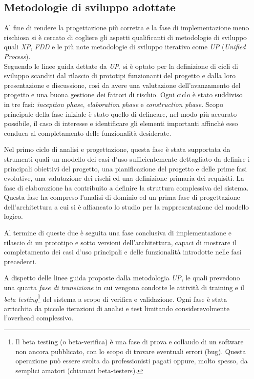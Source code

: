 \subsection{Metodologie di sviluppo adottate}
Al fine di rendere la progettazione più corretta e la fase di implementazione meno rischiosa si è cercato di cogliere gli aspetti qualificanti di metodologie di sviluppo quali \textit{XP}, \textit{FDD} e le più note metodologie di sviluppo iterativo come \textit{UP} (\emph{Unified Process}).\\
Seguendo le linee guida dettate da \textit{UP}, si è optato per la definizione di cicli di sviluppo scanditi dal rilascio di prototipi funzionanti del progetto e dalla loro presentazione e discussione, così da avere una valutazione dell'avanzamento del progetto e una buona gestione dei fattori di rischio. Ogni ciclo è stato suddiviso in tre fasi: \textit{inception phase}, \textit{elaboration phase} e \textit{construction phase}.
Scopo principale della fase iniziale è stato quello di delineare, nel modo più accurato possibile, il caso di interesse e identificare gli elementi importanti affinché esso conduca al completamento delle funzionalità desiderate.

Nel primo ciclo di analisi e progettazione, questa fase è stata supportata da strumenti quali un modello dei casi d'uso sufficientemente dettagliato da definire i principali obiettivi del progetto, una pianificazione del progetto e delle prime fasi evolutive, una valutazione dei rischi ed una definizione primaria dei requisiti.
La fase di elaborazione ha contribuito a definire la struttura complessiva del sistema. Questa fase ha compreso l'analisi di dominio ed un prima fase di progettazione dell'architettura a cui si è affiancato lo studio per la rappresentazione del modello logico.

Al termine di queste due è seguita una fase conclusiva di implementazione e rilascio di un prototipo e sotto versioni dell'architettura, capaci di mostrare il completamento dei casi d'uso principali e delle funzionalità introdotte nelle fasi precedenti.

A dispetto delle linee guida proposte dalla metodologia \emph{UP}, le quali prevedono una quarta \textit{fase di transizione} in cui vengono condotte le attività di training e il \textit{beta testing}\footnote{Il beta testing (o beta-verifica) è una fase di prova e collaudo di un software non ancora pubblicato, con lo scopo di trovare eventuali errori (bug). Questa operazione può essere svolta da professionisti pagati oppure, molto spesso, da semplici amatori (chiamati beta-testers).} del sistema a scopo di verifica e validazione. Ogni fase è stata arricchita da piccole iterazioni di analisi e test limitando considerevolmente l'overhead complessivo.

